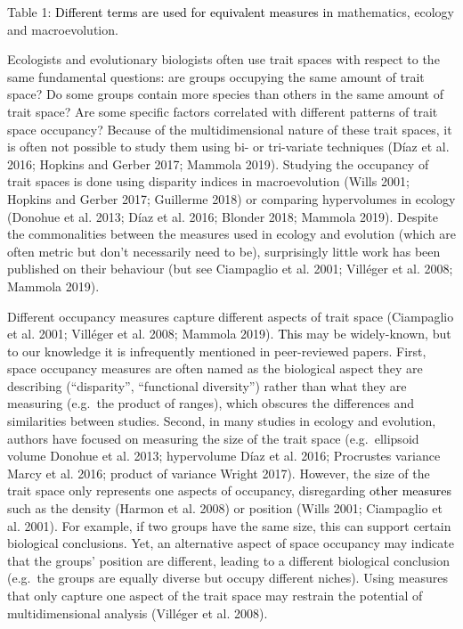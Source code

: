 \documentclass[]{article}
\begin{document}
Table 1: \textcolor{black}{Different terms are used for
equivalent measures in} mathematics, ecology and macroevolution.

\renewcommand\baselinestretch{1.6}\selectfont

Ecologists and evolutionary biologists often use trait spaces with
respect to the same fundamental questions: are groups occupying the same
amount of trait space? Do some groups contain more species than others
in the same amount of trait space? Are some specific factors correlated
with different patterns of trait space occupancy? Because of the
multidimensional nature of these trait spaces, it is often not possible
to study them using bi- or tri-variate techniques (Díaz et al. 2016;
Hopkins and Gerber 2017; Mammola 2019). Studying the occupancy of trait
spaces is done using disparity indices in macroevolution (Wills 2001;
Hopkins and Gerber 2017; Guillerme 2018) or comparing hypervolumes in
ecology (Donohue et al. 2013; Díaz et al. 2016; Blonder 2018; Mammola
2019). Despite the commonalities between the measures used in ecology
and evolution (which are often metric but don't necessarily need to be),
surprisingly little work has been published on their behaviour (but see
Ciampaglio et al. 2001; Villéger et al. 2008; Mammola 2019).

Different occupancy measures capture different aspects of trait space
(Ciampaglio et al. 2001; Villéger et al. 2008; Mammola 2019).
\textcolor{black}{This} may be widely-known, but to
our knowledge it is infrequently mentioned in peer-reviewed papers.
First, space occupancy measures are often named as the biological aspect
they are describing (``disparity'', ``functional diversity'') rather
than what they are measuring (e.g.~the product of ranges), which
obscures the differences and similarities between studies. Second, in
many studies in ecology and evolution, authors have focused on measuring
the size of the trait space (e.g.~ellipsoid volume Donohue et al. 2013;
hypervolume Díaz et al. 2016; Procrustes variance Marcy et al. 2016;
product of variance Wright 2017). However, the size of the trait space
only represents one aspects of occupancy, disregarding
\textcolor{black}{other measures} such as the density
(Harmon et al. 2008) or position (Wills 2001; Ciampaglio et al. 2001).
For example, if two groups have the same size, this can support certain
biological conclusions. Yet, an alternative aspect of space occupancy
may indicate that the groups' position are different, leading to a
different biological conclusion (e.g.~the groups are equally diverse but
occupy different niches). Using measures that only capture one aspect of
the trait space may restrain the potential of multidimensional analysis
(Villéger et al. 2008).
\end{document}
